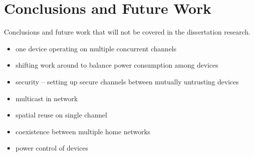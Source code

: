 \section{Conclusions and Future Work}
\label{sec:conclusion}
Conclusions and future work that will not be covered in the
dissertation research.

\begin{itemize}
\item one device operating on multiple concurrent channels
\item shifting work around to balance power consumption among devices
\item security -- setting up secure channels between mutually untrusting devices
\item multicast in network
\item spatial reuse on single channel
\item coexistence between multiple home networks
\item power control of devices
\end{itemize}